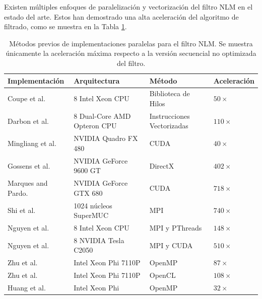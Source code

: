Existen múltiples enfoques de paralelización y vectorización del filtro NLM en el estado del arte. Estos han demostrado una alta aceleración del algoritmo de filtrado, como se muestra en la Tabla \ref{method_table}. 


\begin{table}
\caption[Estado del arte en paralelizaciones del filtro NLM]{Métodos previos de implementaciones paralelas para el filtro NLM. Se muestra únicamente la aceleración máxima respecto a la versión secuencial no optimizada del filtro.}
\begin{tabularx}{1\linewidth}{X X X X} 
\hline
Implementación & Arquitectura & Método & Aceleración \\ [0.5ex]
 \hline\hline
 Coupe et al. \cite{coupe2006fast} &  8 Intel Xeon CPU & Biblioteca de Hilos & $50\times$\\
 Darbon et al. \cite{Darbon2008} &  8 Dual-Core AMD Opteron CPU & Instrucciones Vectorizadas & $110\times$\\
 Mingliang et al. \cite{mingliang2016medical} &  NVIDIA Quadro FX 480 & CUDA & $40\times$\\
Gossens et al. \cite{goossens2010gpu} &  NVIDIA GeForce 9600 GT & DirectX & $402\times$\\
Marques and Pardo. \cite{marques2013implementation} &  NVIDIA GeForce GTX 680 & CUDA & $718\times$\\ 
Shi et al. \cite{shi2015optimized} &   1024 núcleos SuperMUC & MPI & $740\times$\\
Nguyen et al. \cite{nguyen2016medical} &   8 Intel Xeon CPU & MPI y PThreads & $148\times$\\
Nguyen et al. \cite{nguyen2016medical} &   8 NVIDIA Tesla C2050 & MPI y CUDA & $510\times$\\
Zhu et al. \cite{zhu2016parallel} &  Intel Xeon Phi 7110P & OpenMP & $87\times$\\
Zhu et al. \cite{zhu2016parallel} &  Intel Xeon Phi 7110P & OpenCL & $108\times$\\
Huang et al. \cite{huang2017parallel} &  Intel Xeon Phi & OpenMP & $32\times$\\
\end{tabularx}
\label{method_table}
\end{table}

